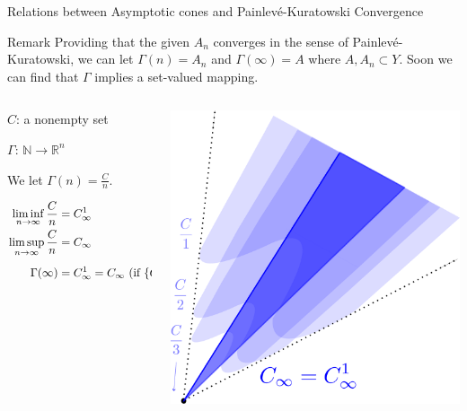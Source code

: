 \documentclass[aspectratio=169, dvipdfmx, 11pt]{beamer} %
\newcommand{\NaturalNumberSet}{\mathbb{N}}
\newcommand{\NDemenstionalRealEuclidianSpace}{\mathbb{R}^n}
\newcommand{\Painleve}{Painlev\'e}
\begin{document}
\begin{frame}[t]{Relations between Asymptotic cones and \Painleve-Kuratowski Convergence}

\begin{alertblock}{Remark}
    Providing that the given $A_n$ converges in the sense of \Painleve-Kuratowski, we can let $\Gamma (n) = A_n$ and $\Gamma (\infty) = A$ where $A, A_n \subset Y$.
    Soon we can find that $\Gamma$ implies a set-valued mapping.
\end{alertblock}

\begin{columns}
    \begin{column}{0.48\textwidth}
    $C$: a nonempty set

    $\Gamma$: $\NaturalNumberSet \rightarrow \NDemenstionalRealEuclidianSpace$

    We let $\Gamma (n) = \frac{C}{n}$.

    \pause
    \centering
    \begin{equation}
        \begin{split}
            \liminf_{n \to \infty} \frac{C}{n} &= C^1_{\infty} \\
            \limsup_{n \to \infty}\frac{C}{n} &= C_{\infty} \\
            \Gamma (\infty) &= C^1_{\infty} = C_{\infty} \text{ (if $\{C_n\}_{n \in \NaturalNumberSet} \coloneqq \frac{C}{n}$ converges in the sense of \Painleve-Kuratowski)} \notag
        \end{split}
    \end{equation}
    \end{column}
    \pause
    \begin{column}{0.48\textwidth}
    \centering
    \includegraphics[keepaspectratio, scale=0.08]{figures/relation_asymptotice_cone_and_p_k_convergence.eps}
    \end{column}
\end{columns}
\end{frame}
\end{document}
